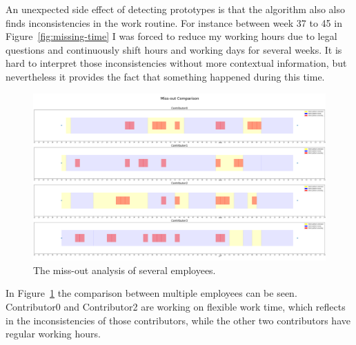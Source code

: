 An unexpected side effect of detecting prototypes is that the algorithm also also finds inconsistencies in the work routine.
For instance between week 37 to 45 in Figure~\ref{fig:missing-time} I was forced to reduce my working hours due to legal questions and continuously shift hours and working days for several weeks.
It is hard to interpret those inconsistencies without more contextual information, but nevertheless it provides the fact that something happened during this time.

\begin{figure}[H]
    \includegraphics[scale=0.20]{./graphs/analysis/work-time-analysis-comparison}
    \centering
    \caption{The miss-out analysis of several employees.}\label{fig:miss-out-comparison}
\end{figure}

In Figure~\ref{fig:miss-out-comparison} the comparison between multiple employees can be seen.
Contributor0 and Contributor2 are working on flexible work time, which reflects in the inconsistencies of those contributors, while the other two contributors have regular working hours.
